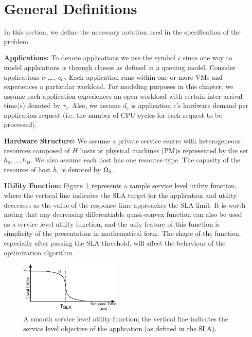 \section{General Definitions} 
\label{sec:general-defs}
In this section, we define the necessary notation used in the specification of the problem. 

\textbf{Applications:} 
To denote applications we use the symbol $c$ since one way to model applications is through classes as defined in a queuing model. Consider applications \texttt{$c_1$},\ldots, \texttt{$c_C$}. Each application runs within one or more VMs and experiences a particular workload.  
For modeling purposes in this chapter, we assume each application experiences an open workload with certain inter-arrival time(s) denoted by $\tau_c$. 
Also, we assume $d_c$ is application $c$'s hardware demand per application request (i.e. the number of CPU cycles for each request to be processed).

\textbf{Hardware Structure:} We assume a private service centre with heterogeneous resources composed of $H$ hosts or physical machines (PM)s represented by the set ${h_0,...,h_H}$. We also assume each host has one resource type. The capacity of the resource of host $h$, is denoted by $\Omega_{h}$.   

\textbf{Utility Function:} 
Figure~\ref{fig:service-level-utility-functions} represents a sample service level utility function, where the vertical line indicates the SLA target for the application and utility decreases as the value of the response time approaches the SLA limit.
It is worth noting that any decreasing differentiable quasi-convex function can also be used as a service level utility function, and the only feature of this function is simplicity of the presentation in mathematical form.
The shape of the function, especially after passing the SLA threshold, will affect the behaviour of the optimization algorithm. 
\begin{figure}[h]
	\centering
	\includegraphics[width=0.45\textwidth]{image/centralized1/image3new}
	\caption[A smooth service level utility function used in a feedback-based optimizer in the private cloud.]{A smooth service level utility function; the vertical line indicates the service level objective of the application (as defined in the SLA).}
	\label{fig:service-level-utility-functions}
\end{figure}

